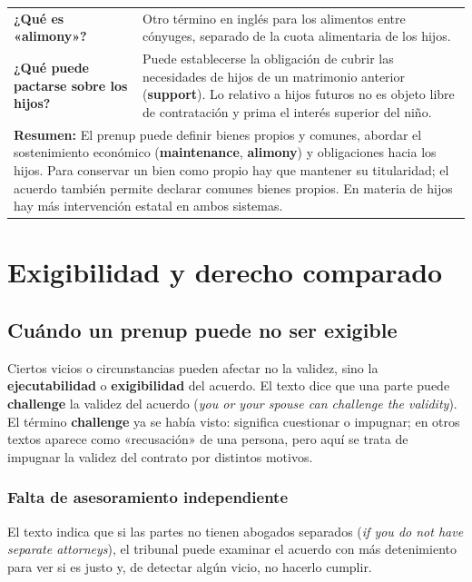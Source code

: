 \documentclass[12pt,oneside]{book}
\newlength{\cornL}
\newlength{\cornR}
\newlength{\cornW}
\begin{document}
\begin{longtable}{@{}p{\cornL}|p{\cornR}@{}}
\textbf{¿Qué es «alimony»?} &
Otro término en inglés para los alimentos entre cónyuges, separado de la cuota alimentaria de los hijos. \\[0.6em]

\textbf{¿Qué puede pactarse sobre los hijos?} &
Puede establecerse la obligación de cubrir las necesidades de hijos de un matrimonio anterior (\textbf{support}). Lo relativo a hijos futuros no es objeto libre de contratación y prima el interés superior del niño. \\[0.6em]

\midrule
\multicolumn{2}{p{\cornW}}{%
\textbf{Resumen:} El prenup puede definir bienes propios y comunes, abordar el sostenimiento económico (\textbf{maintenance}, \textbf{alimony}) y obligaciones hacia los hijos. Para conservar un bien como propio hay que mantener su titularidad; el acuerdo también permite declarar comunes bienes propios. En materia de hijos hay más intervención estatal en ambos sistemas.
} \\
\end{longtable}

\chapter[Exigibilidad y derecho comparado]{Exigibilidad y derecho comparado}

\section{Cuándo un prenup puede no ser exigible}

Ciertos vicios o circunstancias pueden afectar no la validez, sino la \textbf{ejecutabilidad} o \textbf{exigibilidad} del acuerdo. El texto dice que una parte puede \textbf{challenge} la validez del acuerdo (\textit{you or your spouse can challenge the validity}). El término \textbf{challenge} ya se había visto: significa cuestionar o impugnar; en otros textos aparece como «recusación» de una persona, pero aquí se trata de impugnar la validez del contrato por distintos motivos.

\subsection{Falta de asesoramiento independiente}

El texto indica que si las partes no tienen abogados separados (\textit{if you do not have separate attorneys}), el tribunal puede examinar el acuerdo con más detenimiento para ver si es justo y, de detectar algún vicio, no hacerlo cumplir.
\end{document}
